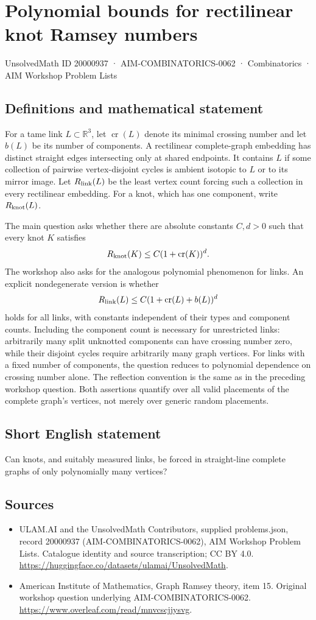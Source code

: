 \documentclass[11pt,a4paper]{article}
\begin{document}
\section*{Polynomial bounds for rectilinear knot Ramsey numbers}\label{20000937}
{\small UnsolvedMath ID 20000937 · AIM-COMBINATORICS-0062 · Combinatorics · AIM Workshop Problem Lists}
\subsection{Definitions and mathematical statement}
For a tame link $L\subset\mathbb R^3$, let $\operatorname{cr}(L)$ denote its minimal crossing number and let $b(L)$ be its number of components.
A rectilinear complete-graph embedding has distinct straight edges intersecting only at shared endpoints.
It contains $L$ if some collection of pairwise vertex-disjoint cycles is ambient isotopic to $L$ or to its mirror image.
Let $R_{\rm link}(L)$ be the least vertex count forcing such a collection in every rectilinear embedding.
For a knot, which has one component, write $R_{\rm knot}(L)$.

The main question asks whether there are absolute constants $C,d>0$ such that every knot $K$ satisfies
\[
 R_{\rm knot}(K)\leq C(1+\operatorname{cr}(K))^d.
\]
The workshop also asks for the analogous polynomial phenomenon for links.
An explicit nondegenerate version is whether
\[
 R_{\rm link}(L)\leq C(1+\operatorname{cr}(L)+b(L))^d
\]
holds for all links, with constants independent of their types and component counts.
Including the component count is necessary for unrestricted links: arbitrarily many split unknotted components can have crossing number zero, while their disjoint cycles require arbitrarily many graph vertices.
For links with a fixed number of components, the question reduces to polynomial dependence on crossing number alone.
The reflection convention is the same as in the preceding workshop question.
Both assertions quantify over all valid placements of the complete graph's vertices, not merely over generic random placements.
\subsection{Short English statement}
Can knots, and suitably measured links, be forced in straight-line complete graphs of only polynomially many vertices?
\subsection{Sources}
\begin{itemize}
\item[S1] ULAM.AI and the UnsolvedMath Contributors, supplied problems.json, record 20000937 (AIM-COMBINATORICS-0062), AIM Workshop Problem Lists. Catalogue identity and source transcription; CC BY 4.0.
\url{https://huggingface.co/datasets/ulamai/UnsolvedMath}.
\item[S2] American Institute of Mathematics, Graph Ramsey theory, item 15. Original workshop question underlying AIM-COMBINATORICS-0062.
\url{https://www.overleaf.com/read/mnvcscjjysvg}.
\end{itemize}
\end{document}
